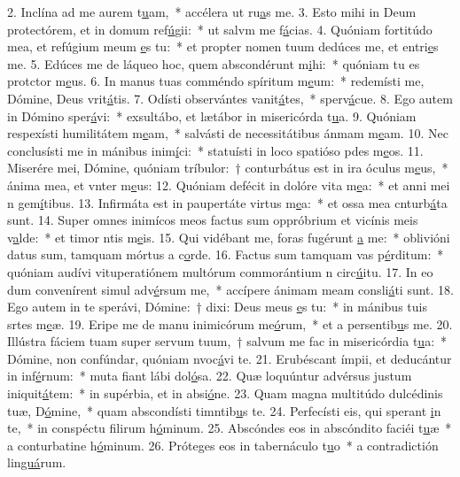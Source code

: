 2. Inclína ad me aurem t\uline{u}am,~* accélera ut ru\uline{a}s me.
3. Esto mihi in Deum protectórem, et in domum ref\uline{ú}gii:~* ut salvm me f\uline{á}cias.
4. Quóniam fortitúdo mea, et refúgium meum \uline{e}s tu:~* et propter nomen tuum dedúces me, et entri\uline{e}s me.
5. Edúces me de láqueo hoc, quem abscondérunt m\uline{i}hi:~* quóniam tu es protctor m\uline{e}us.
6. In manus tuas comméndo spíritum m\uline{e}um:~* redemísti me, Dómine, Deus vrit\uline{á}tis.
7. Odísti observántes vanit\uline{á}tes,~* sperv\uline{á}cue.
8. Ego autem in Dómino sper\uline{á}vi:~* exsultábo, et lætábor in misericórda t\uline{u}a.
9. Quóniam respexísti humilitátem m\uline{e}am,~* salvásti de necessitátibus ánmam m\uline{e}am.
10. Nec conclusísti me in mánibus inim\uline{í}ci:~* statuísti in loco spatióso pdes m\uline{e}os.
11. Miserére mei, Dómine, quóniam tríbulor:~† conturbátus est in ira óculus m\uline{e}us,~* ánima mea, et vnter m\uline{e}us:
12. Quóniam defécit in dolóre vita m\uline{e}a:~* et anni mei n gem\uline{í}tibus.
13. Infirmáta est in paupertáte virtus m\uline{e}a:~* et ossa mea cnturb\uline{á}ta sunt.
14. Super omnes inimícos meos factus sum oppróbrium et vicínis meis v\uline{a}lde:~* et timor ntis m\uline{e}is.
15. Qui vidébant me, foras fugérunt \uline{a} me:~* oblivióni datus sum, tamquam mórtus a c\uline{o}rde.
16. Factus sum tamquam vas p\uline{é}rditum:~* quóniam audívi vituperatiónem multórum commorántium n circ\uline{ú}itu.
17. In eo dum convenírent simul adv\uline{é}rsum me,~* accípere ánimam meam consli\uline{á}ti sunt.
18. Ego autem in te sperávi, Dómine:~† dixi: Deus meus \uline{e}s tu:~* in mánibus tuis srtes m\uline{e}æ.
19. Eripe me de manu inimicórum me\uline{ó}rum,~* et a persentib\uline{u}s me.
20. Illústra fáciem tuam super servum tuum,~† salvum me fac in misericórdia t\uline{u}a:~* Dómine, non confúndar, quóniam nvoc\uline{á}vi te.
21. Erubéscant ímpii, et deducántur in inf\uline{é}rnum:~* muta fiant lábi dol\uline{ó}sa.
22. Quæ loquúntur advérsus justum iniquit\uline{á}tem:~* in supérbia, et in absi\uline{ó}ne.
23. Quam magna multitúdo dulcédinis tuæ, D\uline{ó}mine,~* quam abscondísti timntib\uline{u}s te.
24. Perfecísti eis, qui sperant \uline{i}n te,~* in conspéctu filirum h\uline{ó}minum.
25. Abscóndes eos in abscóndito faciéi t\uline{u}æ~* a conturbatine h\uline{ó}minum.
26. Próteges eos in tabernáculo t\uline{u}o~* a contradictión lin\uline{guá}rum.
